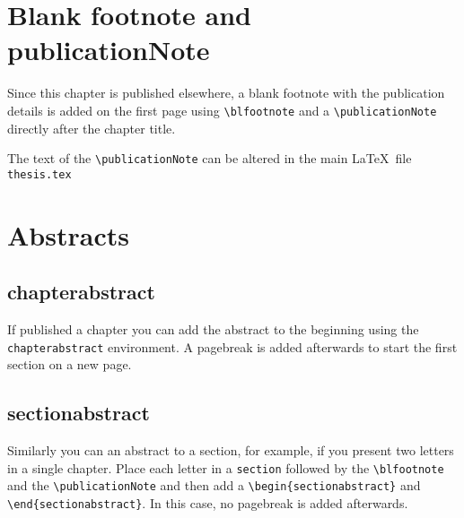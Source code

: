%
% 
\section{Blank footnote and publicationNote}
%
Since this chapter is published elsewhere, a blank footnote with the publication details is added on the first page using \verb|\blfootnote| and a \verb|\publicationNote| directly after the chapter title.

\smallskip

The text of the \verb|\publicationNote| can be altered in the main \LaTeX \ file \verb|thesis.tex|

%
% 
\section{Abstracts}
%

\subsection{chapterabstract}

If published a chapter you can add the abstract to the beginning using the \verb|chapterabstract| environment. A pagebreak is added afterwards to start the first section on a new page.

\subsection{sectionabstract}

Similarly you can an abstract to a section, for example, if you present two letters in a single chapter. Place each letter in a \verb|section| followed by the \verb|\blfootnote| and the \verb|\publicationNote| and then add a \verb|\begin{sectionabstract}| and \verb|\end{sectionabstract}|.
In this case, no pagebreak is added afterwards.

